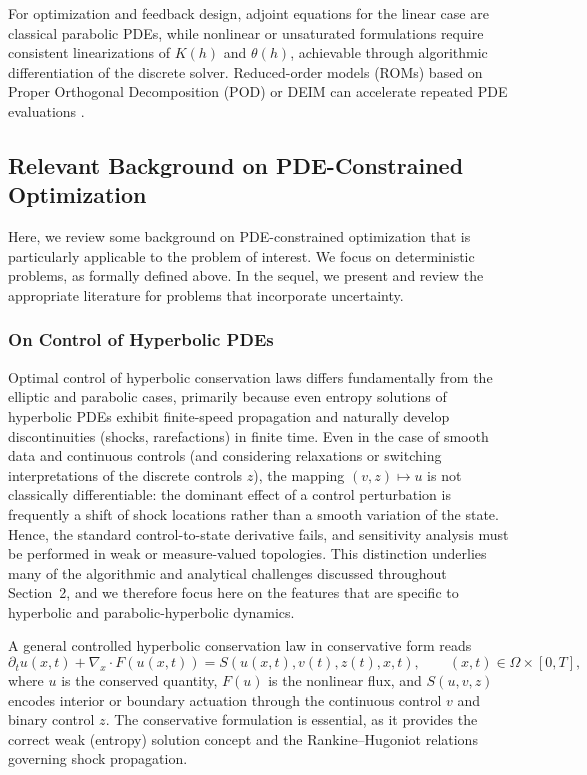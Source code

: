 \documentclass{article}
\newcommand{\1}{\mathds{1}}          %
\theoremstyle{definition}
\begin{document}
\begin{sloppypar}
For optimization and feedback design, adjoint equations for the linear case are classical parabolic PDEs, while nonlinear or unsaturated formulations require consistent linearizations of $K(h)$ and $\theta(h)$, achievable through algorithmic differentiation of the discrete solver. Reduced-order models (ROMs) based on Proper Orthogonal Decomposition (POD) or DEIM can accelerate repeated PDE evaluations \cite{willmann2010}.

\subsection{Relevant Background on PDE-Constrained Optimization} 

Here, we review some background on PDE-constrained optimization that is particularly applicable to the problem of interest. We focus on deterministic problems, as formally defined above. In the sequel, we present and review the appropriate literature for problems that incorporate uncertainty.
\subsubsection{On Control of Hyperbolic PDEs}\label{sec:controlHyperbolicPDE}



Optimal control of hyperbolic conservation laws differs fundamentally from the elliptic and parabolic cases, 
primarily because even entropy solutions of hyperbolic PDEs exhibit finite-speed propagation and naturally develop 
discontinuities (shocks, rarefactions) in finite time. Even in the case of smooth data and continuous controls (and considering relaxations or switching interpretations of the discrete controls $z$), the mapping $(v,z)\mapsto u$ is not classically differentiable: the dominant effect of a control perturbation is frequently a 
shift of shock locations rather than a smooth variation of the state. Hence, the standard control-to-state 
derivative fails, and sensitivity analysis must be performed in weak or measure-valued topologies. This distinction underlies many of the algorithmic and analytical challenges discussed throughout Section~2, and we therefore focus here on the features that are specific to hyperbolic and parabolic-hyperbolic dynamics.

A general controlled hyperbolic conservation law in conservative form reads
\[
\partial_t u(x,t) + \nabla_x\!\cdot F(u(x,t)) 
= S(u(x,t),v(t),z(t),x,t),
\qquad (x,t)\in\Omega\times[0,T],
\]
where $u$ is the conserved quantity, $F(u)$ is the nonlinear flux, and $S(u,v,z)$ encodes interior or boundary 
actuation through the continuous control $v$ and binary control $z$. The conservative formulation is essential, 
as it provides the correct weak (entropy) solution concept and the Rankine--Hugoniot relations governing shock propagation. 


\end{sloppypar}
\end{document}
